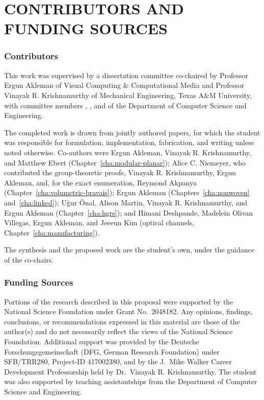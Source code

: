 %
%
%

\chapter*{CONTRIBUTORS AND FUNDING SOURCES}

\subsection*{Contributors}

This work was supervised by a dissertation committee co-chaired by Professor Ergun Akleman of Visual Computing \& Computational Media and Professor Vinayak R. Krishnamurthy of Mechanical Engineering, Texas A\&M University, with committee members \tamumemberone, \tamumembertwo, and \tamumemberthree{} of the Department of Computer Science and Engineering.

The completed work is drawn from jointly authored papers, for which the student was responsible for formulation, implementation, fabrication, and writing unless noted otherwise. Co-authors were Ergun Akleman, Vinayak R. Krishnamurthy, and Matthew Ebert (Chapter~\ref{cha:modular-planar}); Alice C. Niemeyer, who contributed the group-theoretic proofs, Vinayak R. Krishnamurthy, Ergun Akleman, and, for the exact enumeration, Reymond Akpanya (Chapter~\ref{cha:volumetric-bravais}); Ergun Akleman (Chapters~\ref{cha:nonwoven} and~\ref{cha:linked}); U\u{g}ur \"Onal, Alison Martin, Vinayak R. Krishnamurthy, and Ergun Akleman (Chapter~\ref{cha:hgrs}); and Himani Deshpande, Madelein Olivan Villegas, Ergun Akleman, and Jeeeun Kim (optical channels, Chapter~\ref{cha:manufacturing}).

The synthesis and the proposed work are the student's own, under the guidance of the co-chairs.

\subsection*{Funding Sources}

Portions of the research described in this proposal were supported by the National Science Foundation under Grant No.\ 2048182. Any opinions, findings, conclusions, or recommendations expressed in this material are those of the author(s) and do not necessarily reflect the views of the National Science Foundation. Additional support was provided by the Deutsche Forschungsgemeinschaft (DFG, German Research Foundation) under SFB/TRR280, Project-ID 417002380, and by the J.\ Mike Walker Career Development Professorship held by Dr.\ Vinayak R. Krishnamurthy. The student was also supported by teaching assistantships from the Department of Computer Science and Engineering.

\pagebreak{}
